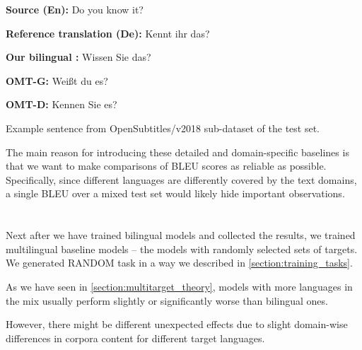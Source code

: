 \vspace{\baselineskip}
\begin{minipage}[t]{0.9\textwidth}

\textbf{Source (En):}  Do you know it? 

\textbf{Reference translation (De):} Kennt ihr das?

\textbf{Our bilingual :} Wissen Sie das?

\textbf{OMT-G:} Weißt du es?

\textbf{OMT-D:} Kennen Sie es?

	\begin{exmp}
	Example sentence from OpenSubtitles/v2018 sub-dataset of 
	the  test set.

	\label{exmp:biling_de_opensubtitles}
	\end{exmp}
\end{minipage}
\vspace{\baselineskip}

The main reason for introducing these detailed and domain-specific
baselines is that we want to make comparisons of BLEU scores as
reliable as possible.
Specifically, since different languages are differently covered by
the text domains, a single BLEU over a mixed test set would likely
hide important observations.

\section{}
\label{section:multilingual_baseline}

Next after we have trained bilingual models and collected the results,
we trained multilingual baseline models -- the models with randomly
selected sets of targets.
We generated RANDOM task in a way we described in \cref{section:training_tasks}.

As we have seen in \cref{section:multitarget_theory}, models with more languages
in the mix usually perform slightly or significantly worse than bilingual ones.

However, there might be different unexpected effects due to slight domain-wise differences
in corpora content for different target languages.

